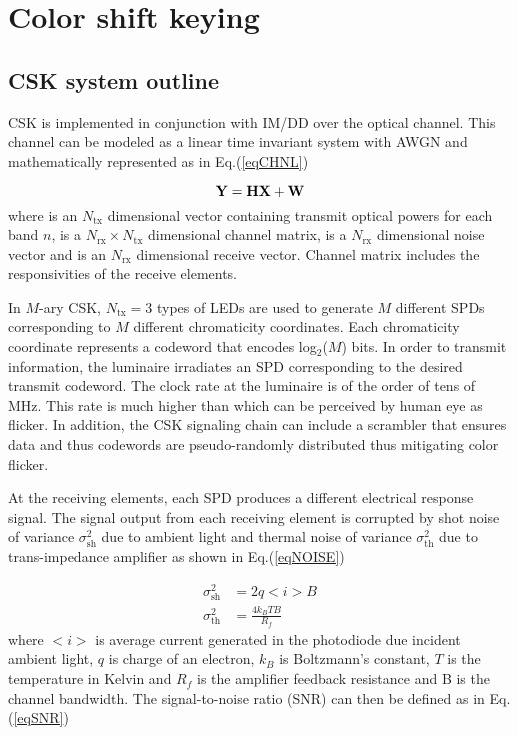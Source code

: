\section{Color shift keying}
\label{sec:csk}
\graphicspath{{_MIMOColor/figures_csk/}}

\subsection{CSK system outline}
\label{subsec:cskOutline}
CSK is implemented in conjunction with IM/DD over the optical channel. This channel can be modeled as a linear time invariant system with AWGN and mathematically represented as in Eq.(\ref{eqCHNL})

\begin{equation}
	{\bf{Y}} = {\bf{H}}{\bf{X}} + {\bf{W}}
	\label{eqCHNL}
\end{equation}
where  is an $N_{\text{tx}}$ dimensional vector containing transmit optical powers for each band $n$,  is a $N_{\text{rx}}\times N_{\text{tx}}$ dimensional channel matrix,  is a $N_{\text{rx}}$ dimensional noise vector and  is an $N_{\text{rx}}$ dimensional receive vector. Channel matrix  includes the responsivities of the receive elements.

In $M$-ary CSK, $N_{\text{tx}}=3$ types of LEDs are used to generate $M$ different SPDs corresponding to $M$ different chromaticity coordinates. Each chromaticity coordinate represents a codeword that encodes log$^{ }_{2}$($M$) bits. In order to transmit information, the luminaire irradiates an SPD corresponding to the desired transmit codeword. The clock rate at the luminaire is of the order of tens of MHz. This rate is much higher than which can be perceived by human eye as flicker. In addition, the CSK signaling chain can include a scrambler that ensures data and thus codewords are pseudo-randomly distributed thus mitigating color flicker.

At the receiving elements, each SPD produces a different electrical response signal. The signal output from each receiving element is corrupted by shot noise of variance $\sigma^{2}_{\text{sh}}$ due to ambient light and thermal noise of variance $\sigma^{2}_{\text{th}}$ due to trans-impedance amplifier as shown in Eq.(\ref{eqNOISE})

\begin{equation}
	\begin{aligned}
	\sigma^{2}_{\text{sh}} &= 2q<i>B\\
	\sigma^{2}_{\text{th}} &= \frac{4k_{B}TB}{R_{f}}
\end{aligned}
\label{eqNOISE}
\end{equation}
where $<i>$ is average current generated in the photodiode due incident ambient light, $q$ is charge of an electron, $k_{B}$ is Boltzmann's constant, $T$ is the temperature in Kelvin and $R_{f}$ is the amplifier feedback resistance and B is the channel bandwidth. The signal-to-noise ratio (SNR) can then be defined as in Eq.(\ref{eqSNR})

